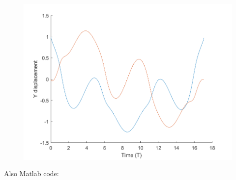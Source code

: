 \documentclass[]{article}
\begin{document}
\begin{figure}
\centering
\includegraphics{./Displacement.png}
\caption{}
\end{figure}

Also Matlab code:
\end{document}
